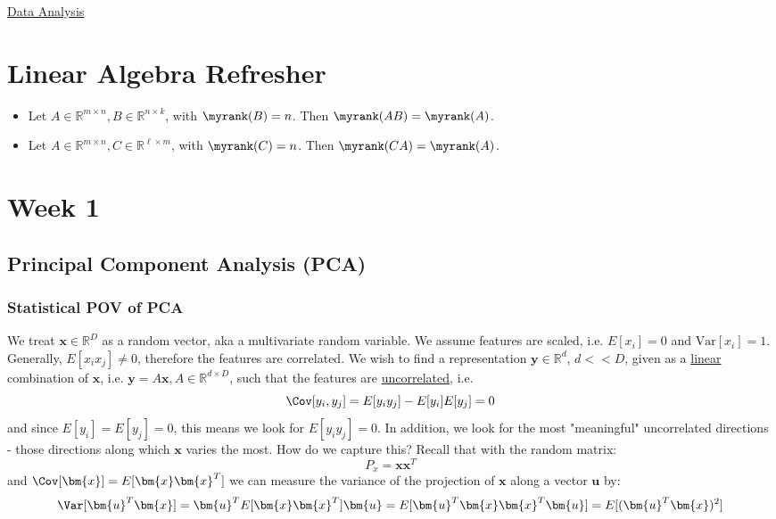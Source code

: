 \documentclass{article}
\begin{document}
\begin{center}
{\huge \underline{Data Analysis}}
\end{center}

\section*{Linear Algebra Refresher}
\begin{theorem} \hphantom{}
  \begin{itemize}
  \item Let $A \in \mathbb{R}^{m \times  n}, B  \in \mathbb{R}^{n \times  k}$, with $\myrank(B) = n$. Then $\myrank(AB) = \myrank(A)$. 
  \item Let $A \in \mathbb{R}^{m \times  n}, C \in \mathbb{R}^{\ell \times  m}$, with $\myrank(C) = n$. Then $\myrank(CA) = \myrank(A)$.  
\end{itemize}
\end{theorem}


\section{Week 1}
\subsection{Principal Component Analysis (PCA)}
\subsubsection{Statistical POV of PCA}
We treat $\bm{x} \in \mathbb{R}^{D}$ as a random vector, aka a multivariate random variable. We assume features are scaled, i.e. $E[x_i]=0$ and $\text{Var}[x_i]=1$.  Generally, $E[x_i x_j] \neq 0$, therefore the features are correlated. We wish to find a representation $\bm{y} \in \mathbb{R}^{d}$, $d <<D$, given as a \ul{linear} combination of $\bm{x}$, i.e. $\bm{y}=A \bm{x}, A \in \mathbb{R}^{d \times D}$, such that the features are \ul{uncorrelated}, i.e.
\[
  \Cov[y_i,y_j]= E[y_i y_j] - E[y_i] E[y_j] =  0
\]
and since $E[y_i]=E[y_j]=0$, this means we look for $E[y_i y_j]=0$. In addition, we look for the most "meaningful" uncorrelated directions - those directions along which $\bm{x}$ varies the most. How do we capture this? Recall that with the random matrix:
\[
  P_{x} = \bm{x} \bm{x}^{T}
\]
and $\Cov[\bm{x}] = E[\bm{x} \bm{x}^{T}]$
we can measure the variance of the projection of $\bm{x}$ along a vector $\bm{u}$ by:
\[
  \Var[\bm{u} ^{T} \bm{x}] = \bm{u}^{T} E[\bm{x} \bm{x}^{T}] \bm{u} = E[\bm{u}^{T} \bm{x} \bm{x} ^{T} \bm{u}] = E[(\bm{u}^{T} \bm{x}) ^2]
\]
\end{document}

